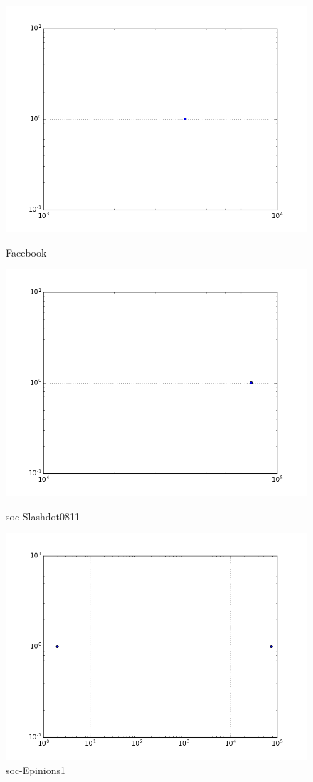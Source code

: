 \begin{figure}[H]
  \includegraphics[width=\linewidth]{img/facebook/comp_dist.png}
  \caption*{Facebook}
\endminipage\hfill
{}
  \includegraphics[width=\linewidth]{img/slashDot/comp_dist.png}
  \caption*{soc-Slashdot0811}
\endminipage\hfill
{}
  \includegraphics[width=\linewidth]{img/soc-E/comp_dist.png}
  \caption*{soc-Epinions1}
\endminipage
\end{figure}
